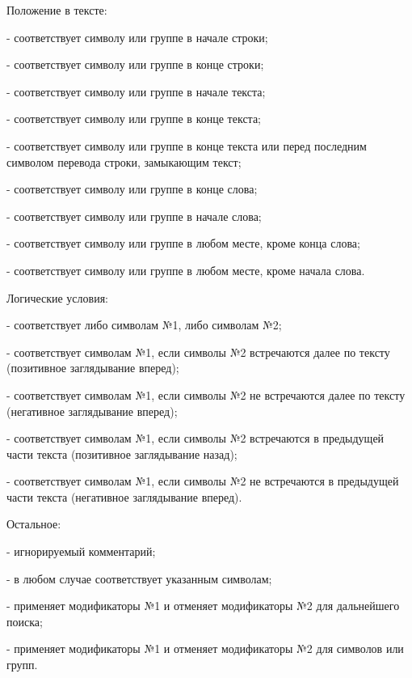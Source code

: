 \begin{keylist}{Положение в тексте:}
  
   - соответствует символу или группе в начале строки;
  
   - соответствует символу или группе в конце строки;
  
   - соответствует символу или группе в начале текста;
  
   - соответствует символу или группе в конце текста;
  
   - соответствует символу или группе в конце текста или перед последним символом перевода строки, замыкающим текст;
  
   - соответствует символу или группе в конце слова;
  
   - соответствует символу или группе в начале слова;
  
   - соответствует символу или группе в любом месте, кроме конца слова;
  
   - соответствует символу или группе в любом месте, кроме начала слова.
\end{keylist}

\begin{keylist}{Логические условия:}
  
   - соответствует либо символам №1, либо символам №2;
  
   - соответствует символам №1, если символы №2 встречаются далее по тексту (позитивное заглядывание вперед);
  
   - соответствует символам №1, если символы №2 не встречаются далее по тексту (негативное заглядывание вперед);
  
   - соответствует символам №1, если символы №2 встречаются в предыдущей части текста (позитивное заглядывание назад);
  
   - соответствует символам №1, если символы №2 не встречаются в предыдущей части текста (негативное заглядывание вперед).
\end{keylist}

\begin{keylist}{Остальное:}
  
   - игнорируемый комментарий;
  
   - в любом случае соответствует указанным символам;
  
   - применяет модификаторы №1 и отменяет модификаторы №2 для дальнейшего поиска;
  
   - применяет модификаторы №1 и отменяет модификаторы №2 для символов или групп.
\end{keylist}